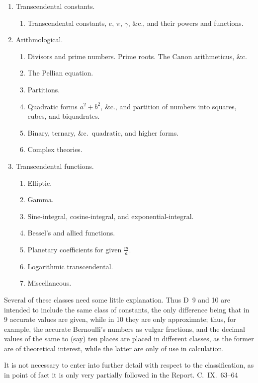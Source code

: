 \documentclass[11pt,a4paper]{article}
\begin{document}
{\begin{enumerate}[label=\Alph*.]
\item Transcendental constants.
\begin{enumerate}[label=\arabic*., resume]
\item Transcendental constants, $e$, $\pi$, $\gamma$, \&c., and their powers and functions.
\end{enumerate}

\item Arithmological.
\begin{enumerate}[label=\arabic*., resume]
\item Divisors and prime numbers. Prime roots. The Canon arithmeticus, \&c.
\item The Pellian equation.
\item Partitions.
\item Quadratic forms $a^2 + b^2$, \&c., and partition of numbers into squares, cubes, and biquadrates.
\item Binary, ternary, \&c.\ quadratic, and higher forms.
\item Complex theories.
\end{enumerate}

\item Transcendental functions.
\begin{enumerate}[label=\arabic*., resume]
\item Elliptic.
\item Gamma.
\item Sine-integral, cosine-integral, and exponential-integral.
\item Bessel's and allied functions.
\item Planetary coefficients for given $\frac{m}{a}$.
\item Logarithmic transcendental.
\item Miscellaneous.
\end{enumerate}
\end{enumerate}

Several of these classes need some little explanation. Thus D~9 and 10 are intended to include the same class of constants, the only difference being that in 9 accurate values are given, while in 10 they are only approximate; thus, for example, the accurate Bernoulli's numbers as vulgar fractions, and the decimal values of the same to (say) ten places are placed in different classes, as the former are of theoretical interest, while the latter are only of use in calculation.

It is not necessary to enter into further detail with respect to the classification, as in point of fact it is only very partially followed in the Report.
\hfill C.~IX.\ 63--64

} %
\end{document}
